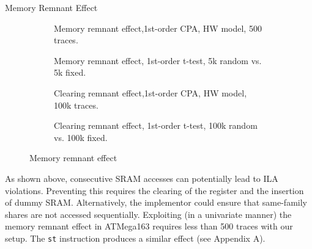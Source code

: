 \begin{subsection}{Memory Remnant Effect}
\begin{figure}[H]
 \begin{subfigure}[b]{0.47\textwidth}

        \caption{\scriptsize{Memory remnant effect,1st-order CPA, HW model, 500 traces.}}

    \end{subfigure}
 \begin{subfigure}[b]{0.47\textwidth}

        \caption{\scriptsize{Memory remnant effect, 1st-order t-test, 5k random vs. 5k fixed.}}

    \end{subfigure}
 \begin{subfigure}[b]{0.47\textwidth}

        \caption{\scriptsize{Clearing remnant effect,1st-order CPA, HW model, 100k traces.}}

    \end{subfigure}
 \begin{subfigure}[b]{0.47\textwidth}

        \caption{\scriptsize{Clearing remnant effect, 1st-order t-test, 100k random vs. 100k fixed.}}

    \end{subfigure}

   
    \caption{Memory remnant effect}\label{fig:regleak}
\end{figure}
As shown above, consecutive SRAM accesses can potentially lead to ILA violations. Preventing this requires the clearing of the register and the insertion of dummy SRAM. Alternatively, the implementor could ensure that same-family shares are not accessed sequentially. Exploiting (in a univariate manner) the memory remnant effect in ATMega163 requires less than 500 traces with our setup. The \texttt{st} instruction produces a similar effect (see Appendix A).
\end{subsection}

